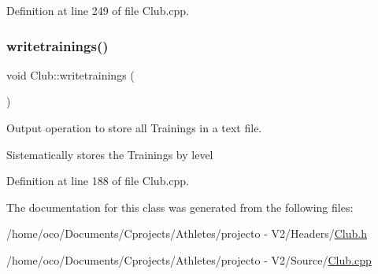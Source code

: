 Definition at line 249 of file Club.\+cpp.

\hypertarget{class_club_a4784eaf929c6c72559ad0f6ba2895a8f}{}\label{class_club_a4784eaf929c6c72559ad0f6ba2895a8f} 
\subsubsection{\texorpdfstring{writetrainings()}{writetrainings()}}
{\footnotesize\ttfamily void Club\+::writetrainings (\begin{DoxyParamCaption}{ }\end{DoxyParamCaption})}



Output operation to store all Trainings in a text file. 

Sistematically stores the Trainings by level 

Definition at line 188 of file Club.\+cpp.



The documentation for this class was generated from the following files\+:\begin{DoxyCompactItemize}
\item 
/home/oco/\+Documents/\+Cprojects/\+Athletes/projecto -\/ V2/\+Headers/\hyperlink{_club_8h}{Club.\+h}\item 
/home/oco/\+Documents/\+Cprojects/\+Athletes/projecto -\/ V2/\+Source/\hyperlink{_club_8cpp}{Club.\+cpp}\end{DoxyCompactItemize}
